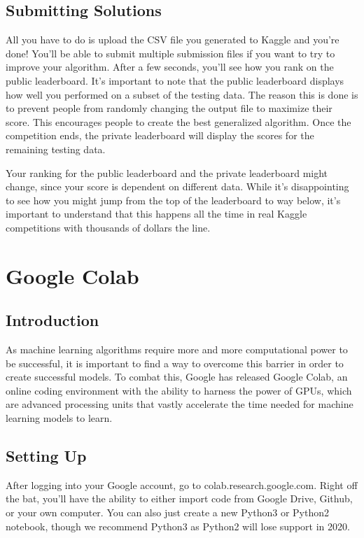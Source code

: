 \documentclass{article}
\begin{document}
\subsection{Submitting Solutions}
All you have to do is upload the CSV file you generated to Kaggle and you're done! You'll be able to submit multiple submission files if you want to try to improve your algorithm.  
After a few seconds, you'll see how you rank on the public leaderboard. It's important to note that the public leaderboard displays how well you performed on a subset of the testing data. The reason this is done is to prevent people from randomly changing the output file to maximize their score. This encourages people to create the best generalized algorithm. Once the competition ends, the private leaderboard will display the scores for the remaining testing data. 

Your ranking for the public leaderboard and the private leaderboard might change, since your score is dependent on different data. While it's disappointing to see how you might jump from the top of the leaderboard to way below, it's important to understand that this happens all the time in real Kaggle competitions with thousands of dollars the line. 

\section{Google Colab}

\subsection{Introduction}

As machine learning algorithms require more and more computational power to be successful, it is important to find a way to overcome this barrier in order to create successful models. To combat this, Google has released Google Colab, an online coding environment with the ability to harness the power of GPUs, which are advanced processing units that vastly accelerate the time needed for machine learning models to learn.

\subsection{Setting Up}

After logging into your Google account, go to colab.research.google.com. Right off the bat, you'll have the ability to either import code from Google Drive, Github, or your own computer. You can also just create a new Python3 or Python2 notebook, though we recommend Python3 as Python2 will lose support in 2020.
\end{document}
